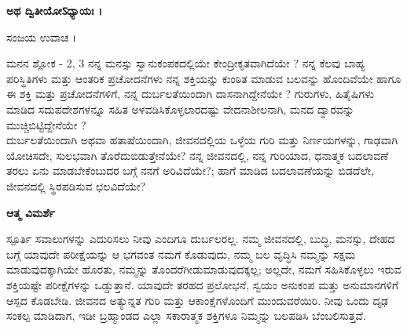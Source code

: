 \begin{center}
{\textbf{ಅಥ ದ್ವಿತೀಯೋऽಧ್ಯಾಯಃ ।}\\}
\end{center}
ಸಂಜಯ ಉವಾಚ ।\\

\newpage
\begin{mananam}{\mananamfont ಮನನ ಶ್ಲೋಕ - \textenglish{2, 3}}
\footnotesize \mananamtext ನನ್ನ ಮನಸ್ಸು ಸ್ವಾನುಕಂಪಕದಲ್ಲಿಯೇ ಕೇಂದ್ರೀಕೃತವಾಗಿದೆಯೇ ? ನನ್ನ ಕೆಲವು ಬಾಹ್ಯ ಪರಿಸ್ಥಿತಿಗಳು ಮತ್ತು ಆಂತರಿಕ ಪ್ರಚೋದನೆಗಳು ನನ್ನ ಶಕ್ತಿಯನ್ನು ಕುಂಠಿತ ಮಾಡುವ ಬಲವನ್ನು ಹೊಂದಿವೆಯೇ ಹಾಗೂ ಈ ಶಕ್ತಿ ಮತ್ತು ಪ್ರಚೋದನೆಗಳಿಗೆ, ನನ್ನ ದುರ್ಬಲತೆಯಿಂದಾಗಿ ದಾಸನಾಗಿದ್ದೇನೆಯೇ ? ಗುರುಗಳು, ಹಿತೈಷಿಗಳು ಮಾಡಿದ ಸದುಪದೇಶಗಳನ್ನೂ ಸಹಿತ ಅಳವಡಿಸಿಕೊಳ್ಳಲಾರದಷ್ಟು ವೇದನಾಶೀಲನಾಗಿ, ಮನದ ದ್ವಾರವನ್ನು ಮುಚ್ಚಿಬಿಟ್ಟಿದ್ದೇನೆಯೇ ?\\
ದುರ್ಬಲತೆಯಿಂದಾಗಿ ಅಥವಾ ಹತಾಷೆಯಿಂದಾಗಿ, ಜೀವನದಲ್ಲಿಯ ಒಳ್ಳೆಯ ಗುರಿ ಮತ್ತು ನಿರ್ಣಯಗಳನ್ನು, ಗಾಢವಾಗಿ ಯೋಚಿಸದೇ, ಸುಲಭವಾಗಿ ತೊರೆದುಬಿಡುತ್ತೇನೆಯೇ? ನನ್ನ ಜೀವನದಲ್ಲಿ, ನನ್ನ ಗುರಿಯಾದ, ಧನಾತ್ಮಕ ಬದಲಾವಣೆ ತರಲು ಏನು ಮಾಡಬೇಕೆಂಬುದರ ಬಗ್ಗೆ ನನಗೆ ಅರಿವಿದೆಯೇ?; ಹಾಗೆ ಮಾಡಿದ ಬದಲಾವಣೆಯನ್ನು ಬಿಡದೆಲೇ, ಜೀವನದಲ್ಲಿ ಸ್ಥಿರಪಡಿಸುವ ಛಲವಿದೆಯೇ?
\end{mananam}
\WritingHand\enspace\textbf{ಆತ್ಮ ವಿಮರ್ಶೆ}\\
\begin{inspiration}{\mananamfont ಸ್ಪೂರ್ತಿ}
\footnotesize \mananamtext ಸವಾಲುಗಳನ್ನು ಎದುರಿಸಲು ನೀವು ಎಂದಿಗೂ ದುರ್ಬಲರಲ್ಲ. ನಮ್ಮ ಜೀವನದಲ್ಲಿ,  ಬುದ್ಧಿ, ಮನಸ್ಸು, ದೇಹದ ಬಗ್ಗೆ ಯಾವುದೇ ಪರೀಕ್ಷೆಯನ್ನು ಆ ಭಗವಂತ ನಮಗೆ ಕೊಡುವುದು, ನಮ್ಮ ಬಲ ವೃದ್ಧಿಸಿ ನಮ್ಮನ್ನು ಸಕ್ಷಮ ಮಾಡುವುದಕ್ಕಾಗಿಯೇ ಹೊರತು,  ನಮ್ಮನ್ನು ತೊಂದರೆಗೀಡುಮಾಡುವುದಕ್ಕಲ್ಲ; ಅಲ್ಲದೇ, ನಮಗೆ ಸಹಿಸಿಕೊಳ್ಳಲು ಇರುವ ಶಕ್ತಿಯಷ್ಟೇ ಪರೀಕ್ಷೆಗಳನ್ನು ಒಡ್ಡುತ್ತಾನೆ. ಯಾವುದೇ ತರಹದ ಪ್ರಲೋಭನೆ, ಸ್ವಯಂ ಅನುಕಂಪ ಮತ್ತು ಅನುಮಾನಗಳಿಗೆ ಆಸ್ಪದ ಕೊಡಬೇಡಿ. ಜೀವನದ ಅತ್ಯುನ್ನತ ಗುರಿ ಮತ್ತು ಆಕಾಂಕ್ಷೆಗಳೊಂದಿಗೆ ಮುಂದುವರೆಯಿರಿ. ನೀವು ಒಂದು ದೃಢ ಸಂಕಲ್ಪ ಮಾಡಿದಾಗ, ಇಡೀ ಬ್ರಹ್ಮಾಂಡದ ಎಲ್ಲಾ ಸಕಾರಾತ್ಮಕ ಶಕ್ತಿಗಳೂ ನಿಮ್ಮನ್ನು ಬಲಪಡಿಸಿ ಬೆಂಬಲಿಸುತ್ತವೆ.
\end{inspiration}
\newpage

